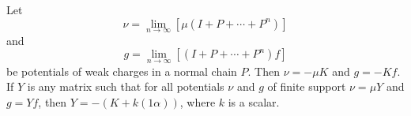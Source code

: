 Let
$$\nu = \lim_{n \to \infty} \left[ \mu(I + P + \cdots + P^n) \right]$$
and
$$g = \lim_{n \to \infty} \left[ (I + P + \cdots + P^n) f \right]$$
be potentials of weak charges in a normal chain $P$. Then $\nu = -\mu K$ and $g = -Kf$. If $Y$ is any matrix such that for all potentials $\nu$ and $g$ of finite support $\nu = \mu Y$ and $g = Yf$, then $Y = -(K + k(1\alpha))$, where $k$ is a scalar.
